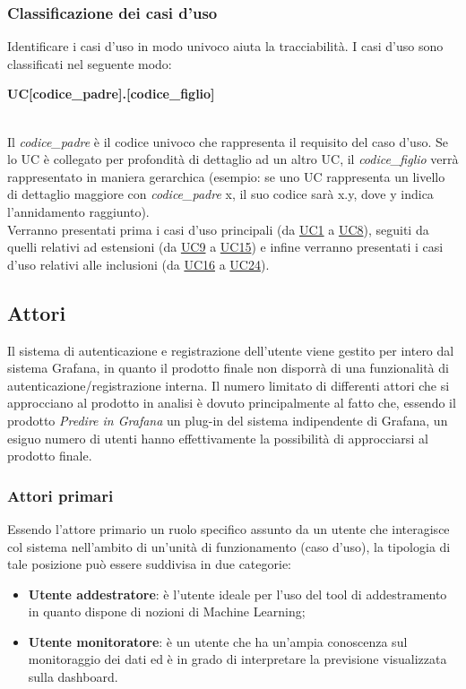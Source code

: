 \subsubsection{Classificazione dei casi d'uso}
Identificare i casi d’uso in modo univoco aiuta la tracciabilità. I casi d’uso sono classificati nel seguente modo:  \\
\centerline{\textbf{UC[codice\_padre].[codice\_figlio]}} \\ 
Il \textit{codice\_padre} è il codice univoco che rappresenta il requisito del caso d’uso. Se lo UC è collegato per profondità di dettaglio ad un altro UC, il \textit{codice\_figlio} verrà rappresentato in maniera gerarchica (esempio: se uno UC rappresenta un livello di dettaglio maggiore con \textit{codice\_padre} x, il suo codice sarà x.y, dove y indica l’annidamento raggiunto). \\ Verranno presentati prima i casi d'uso principali (da \hyperref[par:UC1]{UC1} a \hyperref[par:UC8]{UC8}), seguiti da quelli relativi ad estensioni (da \hyperref[par:UC9]{UC9} a \hyperref[par:UC15]{UC15}) e infine verranno presentati i casi d'uso relativi alle inclusioni (da \hyperref[par:UC16]{UC16} a \hyperref[par:UC24]{UC24}).

	\subsection{Attori}
Il sistema di autenticazione e registrazione dell’utente viene gestito per intero dal sistema Grafana, in quanto il prodotto finale non disporrà di una funzionalità di autenticazione/registrazione interna.
Il numero limitato di differenti attori che si approcciano al prodotto in analisi è dovuto principalmente al fatto che, essendo il prodotto \emph{Predire in Grafana} un plug-in del sistema indipendente di Grafana, un esiguo numero di utenti hanno effettivamente la possibilità di approcciarsi al prodotto finale.

	\subsubsection{Attori primari}
Essendo l’attore primario un ruolo specifico assunto da un utente che interagisce col sistema nell’ambito di un’unità di funzionamento (caso d’uso), la tipologia di tale posizione può essere suddivisa in due categorie:
	\begin{itemize}
		\item\textbf{Utente addestratore}: è l’utente ideale per l’uso del tool di addestramento in quanto dispone di nozioni di Machine Learning;
		\item\textbf{Utente monitoratore}: è un utente che ha un’ampia conoscenza sul monitoraggio dei dati ed è in grado di interpretare la previsione visualizzata sulla dashboard.
		
 	\end{itemize}

